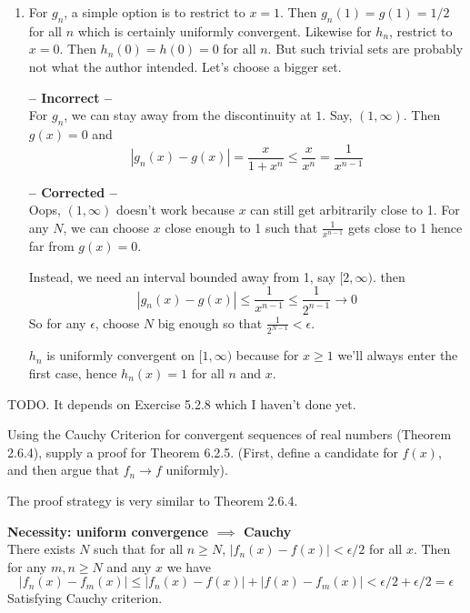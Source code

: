\documentclass{oxmathproblems}
\begin{document}
\begin{questions}
\begin{solution}
\begin{enumerate}[label=(\alph*)]
    \textbf{-- Better solution by chatgpt --}\\
    Use the Continuous Limit Theorem. $g_{n}$ and $h_{n}$ is continuous for all $n$, so if they're uniformly convergent then $g$ and $h$ must be continuous.
    But $g$ is discontinuous at $x=1$ and $h$ at $x=0$.

    \item For $g_{n}$, a simple option is to restrict to $x=1$. Then $g_{n}(1)=g(1)=1/2$ for all $n$ which is certainly uniformly convergent. Likewise for $h_{n}$,
    restrict to $x=0$. Then $h_{n}(0)=h(0)=0$ for all $n$. But such trivial sets are probably not what the author intended. Let's choose a bigger set.

    \textbf{-- Incorrect -- }\\
    For $g_{n}$, we can stay away from the discontinuity at $1$. Say, $(1, \infty)$. Then $g(x)=0$ and
    \[|g_{n}(x)-g(x)|=\frac{x}{1+x^{n}} \leq \frac{x}{x^n}=\frac{1}{x^{n-1}}\]

    \textbf{-- Corrected --}\\
    Oops, $(1, \infty)$ doesn't work because $x$ can still get arbitrarily close to 1. For any $N$, we can choose $x$ close enough to 1
    such that $\frac{1}{x^{n-1}}$ gets close to 1 hence far from $g(x)=0$.

    Instead, we need an interval bounded away from 1, say $[2, \infty)$. then
    \[|g_{n}(x)-g(x)| \leq \frac{1}{x^{n-1}} \leq \frac{1}{2^{n-1}} \to 0\]
    So for any $\epsilon$, choose $N$ big enough so that $\frac{1}{2^{N-1}} < \epsilon$.

    $h_{n}$ is uniformly convergent on $[1, \infty)$ because for $x \geq 1$ we'll always enter the first case, hence $h_{n}(x)=1$ for all $n$ and $x$.
  \end{enumerate}
\end{solution}

\miquestion TODO. It depends on Exercise 5.2.8 which I haven't done yet.

\miquestion Using the Cauchy Criterion for convergent sequences of real numbers (Theorem 2.6.4), supply a proof for Theorem 6.2.5. (First, define a candidate for $f(x)$,
and then argue that $f_{n} \to f$ uniformly).
\begin{solution}
  The proof strategy is very similar to Theorem 2.6.4.

  \textbf{Necessity: uniform convergence $\implies$ Cauchy}\\
  There exists $N$ such that for all $n \geq N$, $|f_{n}(x)-f(x)| < \epsilon/2$ for all $x$. Then for any $m, n \geq N$ and any $x$ we have
  \[|f_{n}(x)-f_{m}(x)| \leq |f_{n}(x) - f(x)| + |f(x)-f_{m}(x)| < \epsilon/2 + \epsilon/2 = \epsilon\]
  Satisfying Cauchy criterion.


\end{solution}
\end{questions}
\end{document}
